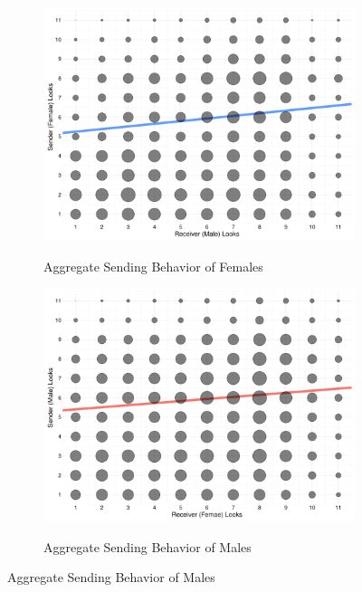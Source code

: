\begin{figure}[!htb]
  \centering
  \caption{}
  \begin{subfigure}[b]{0.49\textwidth}
    \caption{Aggregate Sending Behavior of Females}
    \includegraphics[width=\textwidth]{dotplot_female.pdf}
    \label{fig:dotplot_female}
  \end{subfigure}
  \hfill
  \begin{subfigure}[b]{0.49\textwidth}
    \caption{Aggregate Sending Behavior of Males}
    \includegraphics[width=\textwidth]{dotplot_male.pdf}
    \label{fig:dotplot_male}
  \end{subfigure}
\end{figure}



